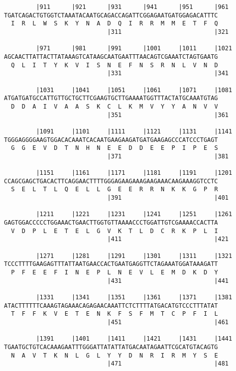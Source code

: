 \documentclass{article}
\begin{document}
\begin{Verbatim}
         |911      |921      |931      |941      |951      |961
TGATCAGACTGTGGTCTAAATACAATGCAGACCAGATTCGGAGAATGATGGAGACATTTC
  I  R  L  W  S  K  Y  N  A  D  Q  I  R  R  M  M  E  T  F  Q
                             |311                          |321
  
         |971      |981      |991      |1001     |1011     |1021
AGCAACTTATTACTTATAAAGTCATAAGCAATGAATTTAACAGTCGAAATCTAGTGAATG
  Q  L  I  T  Y  K  V  I  S  N  E  F  N  S  R  N  L  V  N  D
                             |331                          |341
  
         |1031     |1041     |1051     |1061     |1071     |1081
ATGATGATGCCATTGTTGCTGCTTCGAAGTGCTTGAAAATGGTTTACTATGCAAATGTAG
  D  D  A  I  V  A  A  S  K  C  L  K  M  V  Y  Y  A  N  V  V
                             |351                          |361
  
         |1091     |1101     |1111     |1121     |1131     |1141
TGGGAGGGGAAGTGGACACAAATCACAATGAAGAAGATGATGAAGAGCCCATCCCTGAGT
  G  G  E  V  D  T  N  H  N  E  E  D  D  E  E  P  I  P  E  S
                             |371                          |381
  
         |1151     |1161     |1171     |1181     |1191     |1201
CCAGCGAGCTGACACTTCAGGAACTTTTGGGAGAAGAAAGAAGAAACAAGAAAGGTCCTC
  S  E  L  T  L  Q  E  L  L  G  E  E  R  R  N  K  K  G  P  R
                             |391                          |401
  
         |1211     |1221     |1231     |1241     |1251     |1261
GAGTGGACCCCCTGGAAACTGAACTTGGTGTTAAAACCCTGGATTGTCGAAAACCACTTA
  V  D  P  L  E  T  E  L  G  V  K  T  L  D  C  R  K  P  L  I
                             |411                          |421
  
         |1271     |1281     |1291     |1301     |1311     |1321
TCCCTTTTGAAGAGTTTATTAATGAACCACTGAATGAGGTTCTAGAAATGGATAAAGATT
  P  F  E  E  F  I  N  E  P  L  N  E  V  L  E  M  D  K  D  Y
                             |431                          |441
  
         |1331     |1341     |1351     |1361     |1371     |1381
ATACTTTTTTCAAAGTAGAAACAGAGAACAAATTCTCTTTTATGACATGTCCCTTTATAT
  T  F  F  K  V  E  T  E  N  K  F  S  F  M  T  C  P  F  I  L
                             |451                          |461
  
         |1391     |1401     |1411     |1421     |1431     |1441
TGAATGCTGTCACAAAGAATTTGGGATTATATTATGACAATAGAATTCGCATGTACAGTG
  N  A  V  T  K  N  L  G  L  Y  Y  D  N  R  I  R  M  Y  S  E
                             |471                          |481
  

\end{Verbatim}
\end{document}
